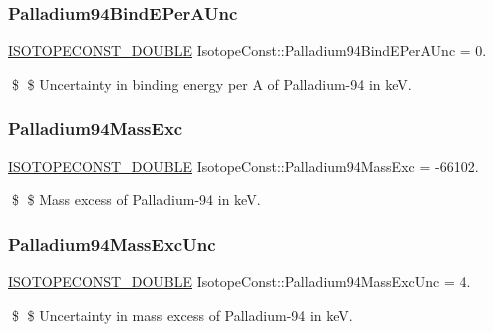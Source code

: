 \subsubsection{\texorpdfstring{Palladium94\+Bind\+E\+Per\+A\+Unc}{Palladium94BindEPerAUnc}}
{\footnotesize\ttfamily \mbox{\hyperlink{group___isotope_const-_macros_ga8f45a7272ce02c0b4c65c44636ed719a}{I\+S\+O\+T\+O\+P\+E\+C\+O\+N\+S\+T\+\_\+\+D\+O\+U\+B\+LE}} Isotope\+Const\+::\+Palladium94\+Bind\+E\+Per\+A\+Unc = 0.}

\$ \$ Uncertainty in binding energy per A of Palladium-\/94 in keV. \mbox{\label{group___isotope_const-_palladium-_pd94_ga78327d9e8ba513a6b8216e937a1cd76b}} 
\subsubsection{\texorpdfstring{Palladium94\+Mass\+Exc}{Palladium94MassExc}}
{\footnotesize\ttfamily \mbox{\hyperlink{group___isotope_const-_macros_ga8f45a7272ce02c0b4c65c44636ed719a}{I\+S\+O\+T\+O\+P\+E\+C\+O\+N\+S\+T\+\_\+\+D\+O\+U\+B\+LE}} Isotope\+Const\+::\+Palladium94\+Mass\+Exc = -\/66102.}

\$ \$ Mass excess of Palladium-\/94 in keV. \mbox{\label{group___isotope_const-_palladium-_pd94_gae5faf7f9417d86abfa97e13ef36eaa4f}} 
\subsubsection{\texorpdfstring{Palladium94\+Mass\+Exc\+Unc}{Palladium94MassExcUnc}}
{\footnotesize\ttfamily \mbox{\hyperlink{group___isotope_const-_macros_ga8f45a7272ce02c0b4c65c44636ed719a}{I\+S\+O\+T\+O\+P\+E\+C\+O\+N\+S\+T\+\_\+\+D\+O\+U\+B\+LE}} Isotope\+Const\+::\+Palladium94\+Mass\+Exc\+Unc = 4.}

\$ \$ Uncertainty in mass excess of Palladium-\/94 in keV. \mbox{\label{group___isotope_const-_palladium-_pd94_gad64b0b18247c2ef0ef6380474e3b52e8}} 
